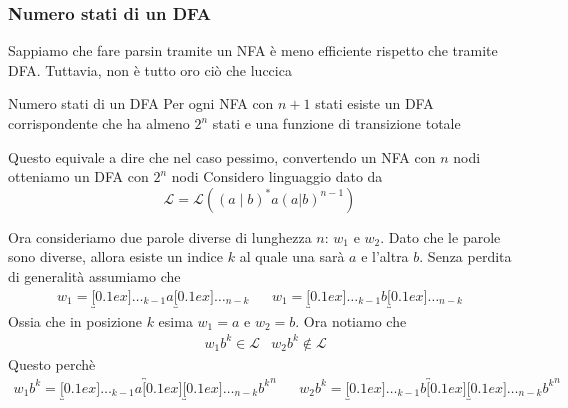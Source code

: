 \subsubsection{Numero stati di un DFA}
Sappiamo che fare parsin tramite un NFA è meno efficiente rispetto che tramite DFA. Tuttavia, non è tutto oro ciò che luccica
\begin{teorema}{Numero stati di un DFA}
	Per ogni NFA con $ n+1 $ stati esiste un DFA corrispondente che ha almeno $ 2^{n} $ stati e una funzione di transizione totale
\end{teorema}
Questo equivale a dire che nel caso pessimo, convertendo un NFA con $ n $ nodi otteniamo un DFA con $ 2^{n} $ nodi
Considero linguaggio dato da
\[
	\mathcal{L} = \mathcal{L}\left(\left(a \mid b\right)^{*} a \left(a | b\right)^{n-1}\right)
\]
\begin{center}
\end{center}
Ora consideriamo due parole diverse di lunghezza $ n $: $ w_1 $ e $ w_2 $. Dato che le parole sono diverse, allora esiste un indice $ k $ al quale una sarà $ a $ e l'altra $ b $. Senza perdita di generalità assumiamo che
\begin{align*}
	w_1 = \underbracket[0.1ex]{\ldots }_{k-1} a \underbracket[0.1ex]{\ldots}_{n - k} &  &
	w_1 = \underbracket[0.1ex]{\ldots }_{k-1} b \underbracket[0.1ex]{\ldots}_{n - k}
\end{align*}
Ossia che in posizione $ k $ esima $ w_1 = a $ e $ w_2 =b $. Ora notiamo che
\begin{align*}
	 & w_1 b^{k} \in \mathcal{L}
	 & w_2 b^{k} \not \in \mathcal{L}
\end{align*}
Questo perchè
\begin{align*}
	w_1 b^{k} = \underbracket[0.1ex]{\ldots }_{k-1} a \overbracket[0.1ex]{\underbracket[0.1ex]{\ldots}_{n - k} b^{k}}^{n} &  &
	w_2 b^{k} = \underbracket[0.1ex]{\ldots }_{k-1} b \overbracket[0.1ex]{\underbracket[0.1ex]{\ldots}_{n - k} b^{k}}^{n}
\end{align*}

